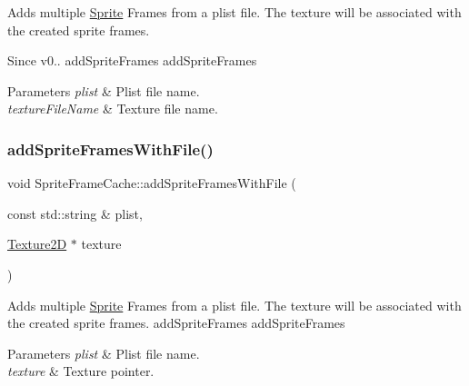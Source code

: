 Adds multiple \hyperlink{classSprite}{Sprite} Frames from a plist file. The texture will be associated with the created sprite frames. \begin{DoxySince}{Since}
v0..  add\+Sprite\+Frames  add\+Sprite\+Frames
\end{DoxySince}

\begin{DoxyParams}{Parameters}
{\em plist} & Plist file name. \\
\hline
{\em texture\+File\+Name} & Texture file name. \\
\hline
\end{DoxyParams}
\mbox{\label{classSpriteFrameCache_a0cadaca840049f5009c7b2a288a9bd70}} 
\subsubsection{\texorpdfstring{add\+Sprite\+Frames\+With\+File()}{addSpriteFramesWithFile()}\hspace{0.1cm}{\footnotesize\ttfamily [6/6]}}
{\footnotesize\ttfamily void Sprite\+Frame\+Cache\+::add\+Sprite\+Frames\+With\+File (\begin{DoxyParamCaption}\item[{const std\+::string \&}]{plist,  }\item[{\hyperlink{classTexture2D}{Texture2D} $\ast$}]{texture }\end{DoxyParamCaption})}

Adds multiple \hyperlink{classSprite}{Sprite} Frames from a plist file. The texture will be associated with the created sprite frames.  add\+Sprite\+Frames  add\+Sprite\+Frames


\begin{DoxyParams}{Parameters}
{\em plist} & Plist file name. \\
\hline
{\em texture} & Texture pointer. \\
\hline
\end{DoxyParams}
\mbox{\label{classSpriteFrameCache_a6288e49af5e6b3b052de916565923c32}} 
